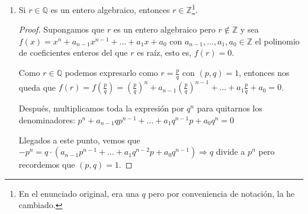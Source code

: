 \documentclass[paper=a4, fontsize=11pt, spanish]{scrartcl}
\begin{document}
\begin{enumerate}
\begin{proof}[Solución]
			$$\left.\begin{aligned}
				(1\ 3)A = C\\
				(1\ 3)B = B
			\end{aligned}\right\} \Rightarrow \phi((1\ 3)) = \begin{pmatrix} -1 & 0\\ -1 & 1 \end{pmatrix}$$
			
			$$\left.\begin{aligned}
				(2\ 3)A = A\\
				(2\ 3)B = C
			\end{aligned}\right\} \Rightarrow \phi((2\ 3)) = \begin{pmatrix} 1 & -1\\ 0 & -1 \end{pmatrix}$$
			
			$$\left.\begin{aligned}
				(1\ 2\ 3)A = B\\
				(1\ 2\ 3)B = C
			\end{aligned}\right\} \Rightarrow \phi((1\ 2\ 3)) = \begin{pmatrix} 0 & -1\\ 1 & -1 \end{pmatrix}$$
			
			$$\left.\begin{aligned}
				(1\ 3\ 2)A = C\\
				(1\ 3\ 2)B = A
			\end{aligned}\right\} \Rightarrow \phi((1\ 3\ 2)) = \begin{pmatrix} -1 & 1\\ -1 & 0 \end{pmatrix}$$
		\end{proof}
       
		\item Si $r \in \mathbb{Q}$ es un entero algebraico, entonces $r \in \mathbb{Z}$\footnote{En el
		enunciado original, era una $q$ pero por conveniencia de notación, la he cambiado.}.
		\begin{proof}
			Supongamos que $r$ es un entero algebraico pero $r \notin \mathbb{Z}$ y sea $f(x) = x^n +
			a_{n-1}x^{n-1} + \dots + a_1x + a_0$ con $a_{n-1}, \dots, a_1, a_0 \in \mathbb{Z}$ el polinomio de
			coeficientes enteros del que $r$ es raíz, esto es, $f(r) = 0$.
			
			Como $r \in \mathbb{Q}$ podemos expresarlo como $\displaystyle r = \frac{p}{q}$ con $(p, q) = 1$,
			entonces nos queda que $\displaystyle f(r) = f\left(\frac{p}{q}\right) = \left(\frac{p}{q}\right)^n
			+ a_{n-1} \left(\frac{p}{q}\right)^{n-1} + \dots + a_1\frac{p}{q} + a_0 = 0$.
			
			Después, multiplicamos toda la expresión por $q^n$ para quitarnos los denominadores: $p^n +
			a_{n-1}qp^{n-1} + \dots + a_1q^{n-1}p + a_0q^n = 0$
			
			Llegados a este punto, vemos que $-p^n = q \cdot \left(a_{n-1}p^{n-1} + \dots + a_1q^{n-2}p +
			a_0q^{n-1}\right) \Rightarrow q$ divide a $p^n$ pero recordemos que $(p, q) = 1$.
		\end{proof}
	\end{enumerate}
\end{document}
